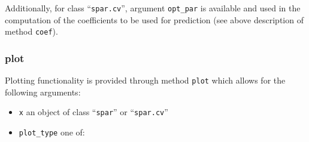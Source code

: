 \documentclass[
  article]{jss}
\begin{document}
Additionally, for class ``\texttt{spar.cv}'', argument \texttt{opt\_par}
is available and used in the computation of the coefficients to be used
for prediction (see above description of method \texttt{coef}).

\subsubsection{plot}\label{plot}

Plotting functionality is provided through method \texttt{plot} which
allows for the following arguments:

\begin{itemize}
\item
  \texttt{x} an object of class ``\texttt{spar}'' or
  ``\texttt{spar.cv}''
\item
  \texttt{plot\_type} one of:


\end{itemize}
\end{document}
